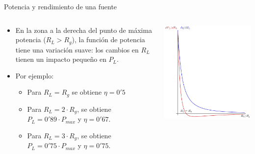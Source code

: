 \documentclass[aspectratio=169, usenames,svgnames,dvipsnames]{beamer}
\begin{document}
\begin{frame}[label={sec:orgfa1cc5f}]{Potencia y rendimiento de una fuente}
\begin{columns}
\begin{column}{0.5\columnwidth}
\begin{itemize}
\item En la zona a la derecha del punto de máxima potencia (\(R_L > R_g\)), la función de potencia tiene una variación suave: los cambios en \(R_L\) tienen un impacto pequeño en \(P_L\).
\item Por ejemplo:
\begin{itemize}
\item Para \(R_L = R_g\) se obtiene \(\eta = 0'5\)
\item Para \(R_L = 2\cdot R_g\), se obtiene \(P_L = 0'89 \cdot P_{max}\) y \(\eta = 0'67\).
\item Para \(R_L = 3\cdot R_g\), se obtiene \(P_L = 0'75 \cdot P_{max}\) y \(\eta = 0'75\).
\end{itemize}
\end{itemize}
\end{column}
\begin{column}{0.5\columnwidth}
\begin{center}
\includegraphics[height=0.85\textheight]{../figs/FuenteReal_DifPotencia.pdf}
\end{center}
\end{column}
\end{columns}
\end{frame}
\end{document}
